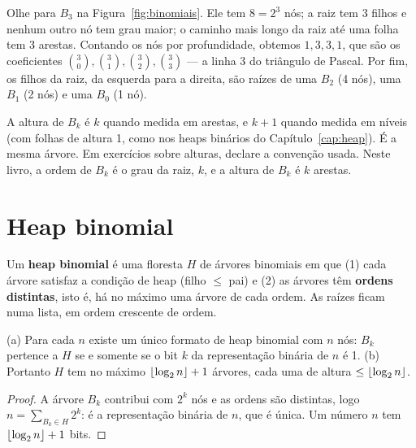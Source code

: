 \begin{exemplo}
Olhe para $B_3$ na Figura~\ref{fig:binomiais}. Ele tem $8=2^3$ nós; a raiz tem 3 filhos e nenhum outro nó tem grau maior; o caminho mais longo da raiz até uma folha tem 3 arestas. Contando os nós por profundidade, obtemos $1,3,3,1$, que são os coeficientes $\binom30,\binom31,\binom32,\binom33$ --- a linha 3 do triângulo de Pascal. Por fim, os filhos da raiz, da esquerda para a direita, são raízes de uma $B_2$ (4 nós), uma $B_1$ (2 nós) e uma $B_0$ (1 nó).
\end{exemplo}

\begin{cuidado}
A altura de $B_k$ é $k$ quando medida em arestas, e $k+1$ quando medida em níveis (com folhas de altura 1, como nos heaps binários do Capítulo~\ref{cap:heap}). É a mesma árvore. Em exercícios sobre alturas, declare a convenção usada. Neste livro, a ordem de $B_k$ é o grau da raiz, $k$, e a altura de $B_k$ é $k$ arestas.
\end{cuidado}

\section{Heap binomial}\label{sec:heapbinomial}
\begin{defi}
Um \textbf{heap binomial} é uma floresta $H$ de árvores binomiais em que (1) cada árvore satisfaz a condição de heap (filho $\le$ pai) e (2) as árvores têm \textbf{ordens distintas}, isto é, há no máximo uma árvore de cada ordem. As raízes ficam numa lista, em ordem crescente de ordem.
\end{defi}

\begin{prop}
(a) Para cada $n$ existe um único formato de heap binomial com $n$ nós: $B_k$ pertence a $H$ se e somente se o bit $k$ da representação binária de $n$ é 1. (b) Portanto $H$ tem no máximo $\lfloor\log_2n\rfloor+1$ árvores, cada uma de altura $\le\lfloor\log_2n\rfloor$.
\end{prop}
\begin{proof}
A árvore $B_k$ contribui com $2^k$ nós e as ordens são distintas, logo $n=\sum_{B_k\in H}2^k$: é a representação binária de $n$, que é única. Um número $n$ tem $\lfloor\log_2n\rfloor+1$ bits.
\end{proof}

